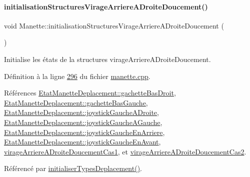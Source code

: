 \paragraph{\texorpdfstring{initialisation\+Structures\+Virage\+Arriere\+A\+Droite\+Doucement()}{initialisationStructuresVirageArriereADroiteDoucement()}}
{\footnotesize\ttfamily void Manette\+::initialisation\+Structures\+Virage\+Arriere\+A\+Droite\+Doucement (\begin{DoxyParamCaption}{ }\end{DoxyParamCaption})\hspace{0.3cm}{\ttfamily [private]}}



Initialise les états de la structures virage\+Arriere\+A\+Droite\+Doucement. 



Définition à la ligne \hyperlink{manette_8cpp_source_l00296}{296} du fichier \hyperlink{manette_8cpp_source}{manette.\+cpp}.



Références \hyperlink{manette_8h_source_l00185}{Etat\+Manette\+Deplacement\+::gachette\+Bas\+Droit}, \hyperlink{manette_8h_source_l00184}{Etat\+Manette\+Deplacement\+::gachette\+Bas\+Gauche}, \hyperlink{manette_8h_source_l00183}{Etat\+Manette\+Deplacement\+::joystick\+Gauche\+A\+Droite}, \hyperlink{manette_8h_source_l00182}{Etat\+Manette\+Deplacement\+::joystick\+Gauche\+A\+Gauche}, \hyperlink{manette_8h_source_l00181}{Etat\+Manette\+Deplacement\+::joystick\+Gauche\+En\+Arriere}, \hyperlink{manette_8h_source_l00180}{Etat\+Manette\+Deplacement\+::joystick\+Gauche\+En\+Avant}, \hyperlink{manette_8h_source_l00243}{virage\+Arriere\+A\+Droite\+Doucement\+Cas1}, et \hyperlink{manette_8h_source_l00244}{virage\+Arriere\+A\+Droite\+Doucement\+Cas2}.



Référencé par \hyperlink{manette_8cpp_source_l00085}{initialiser\+Types\+Deplacement()}.


